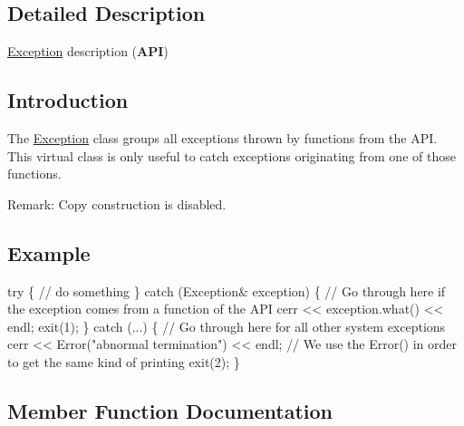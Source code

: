 \subsection{Detailed Description}
\mbox{\hyperlink{classHurricane_1_1Exception}{Exception}} description ({\bfseries A\+PI}) 

\hypertarget{classHurricane_1_1Exception_secExceptionIntro}{}\subsection{Introduction}\label{classHurricane_1_1Exception_secExceptionIntro}
The \mbox{\hyperlink{classHurricane_1_1Exception}{Exception}} class groups all exceptions thrown by functions from the A\+PI. This virtual class is only useful to catch exceptions originating from one of those functions.

\begin{DoxyParagraph}{Remark\+: Copy construction is disabled.}

\end{DoxyParagraph}
\hypertarget{classHurricane_1_1Exception_secExceptionExample}{}\subsection{Example}\label{classHurricane_1_1Exception_secExceptionExample}

\begin{DoxyCode}
\textcolor{keywordflow}{try} \{
   \textcolor{comment}{// do something}
\}
\textcolor{keywordflow}{catch} (Exception& exception) \{
   \textcolor{comment}{// Go through here if the exception comes from a function of the API}
   cerr << exception.what() << endl;
   exit(1);
\}
\textcolor{keywordflow}{catch} (...) \{
   \textcolor{comment}{// Go through here for all other system exceptions}
   cerr << Error(\textcolor{stringliteral}{"abnormal termination"}) << endl;
   \textcolor{comment}{// We use the Error() in order to get the same kind of printing}
   exit(2);
\}
\end{DoxyCode}
 

\subsection{Member Function Documentation}
\mbox{\label{classHurricane_1_1Exception_a6d8036af345628567494eeab9c8e2e3a}} 
